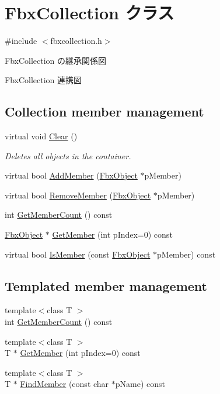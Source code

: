 \hypertarget{class_fbx_collection}{}\section{Fbx\+Collection クラス}
\label{class_fbx_collection}


{\ttfamily \#include $<$fbxcollection.\+h$>$}



Fbx\+Collection の継承関係図


Fbx\+Collection 連携図
\subsection*{Collection member management}
\begin{DoxyCompactItemize}
\item 
virtual void \hyperlink{class_fbx_collection_a79ba35ab4693cd1b1c79a221d7d2f8d3}{Clear} ()
\begin{DoxyCompactList}\small\item\em Deletes all objects in the container. \end{DoxyCompactList}\item 
virtual bool \hyperlink{class_fbx_collection_a8f9bfa57454dda20ef75dd4f27761a15}{Add\+Member} (\hyperlink{class_fbx_object}{Fbx\+Object} $\ast$p\+Member)
\item 
virtual bool \hyperlink{class_fbx_collection_a8a65c60bae5ebfcd19f4aaad99ec10f1}{Remove\+Member} (\hyperlink{class_fbx_object}{Fbx\+Object} $\ast$p\+Member)
\item 
int \hyperlink{class_fbx_collection_a3e22b8afd7b46dcc4988c2723dd75e02}{Get\+Member\+Count} () const
\item 
\hyperlink{class_fbx_object}{Fbx\+Object} $\ast$ \hyperlink{class_fbx_collection_a79c52e9fdd2c04a29b5ba04ff7e15bc6}{Get\+Member} (int p\+Index=0) const
\item 
virtual bool \hyperlink{class_fbx_collection_a988fd0dcbe61e4b9b165d6830543f49e}{Is\+Member} (const \hyperlink{class_fbx_object}{Fbx\+Object} $\ast$p\+Member) const
\end{DoxyCompactItemize}
\subsection*{Templated member management}
\begin{DoxyCompactItemize}
\item 
{\footnotesize template$<$class T $>$ }\\int \hyperlink{class_fbx_collection_a0bc6b29ae68a76d65c554c7217432cca}{Get\+Member\+Count} () const
\item 
{\footnotesize template$<$class T $>$ }\\T $\ast$ \hyperlink{class_fbx_collection_a36af3c2dc008c0c6261ff29b492eaee0}{Get\+Member} (int p\+Index=0) const
\item 
{\footnotesize template$<$class T $>$ }\\T $\ast$ \hyperlink{class_fbx_collection_ac68aa37ee6d89cb3cc066ca1407cb505}{Find\+Member} (const char $\ast$p\+Name) const
\end{DoxyCompactItemize}
